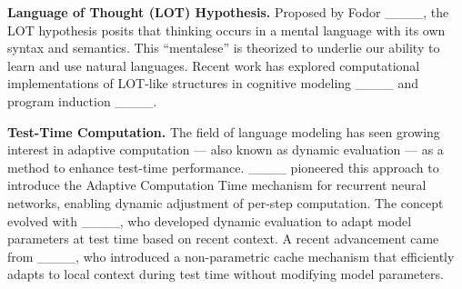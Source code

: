  {\bf Language of Thought (LOT) Hypothesis.}  Proposed by Fodor ____, the LOT hypothesis posits that thinking occurs in a mental language with its own syntax and semantics. This ``mentalese'' is theorized to underlie our ability to learn and use natural languages. Recent work has explored computational implementations of LOT-like structures in cognitive modeling ____ and program induction ____.

{\bf Test-Time Computation.} The field of language modeling has seen growing interest in adaptive computation --- also known as dynamic evaluation --- as a method to enhance test-time performance. ____ pioneered this approach to introduce the Adaptive Computation Time mechanism for recurrent neural networks, enabling dynamic adjustment of per-step computation. The concept evolved with ____, who developed dynamic evaluation to adapt model parameters at test time based on recent context. A recent advancement came from ____, who introduced a non-parametric cache mechanism that efficiently adapts to local context during test time without modifying model parameters.